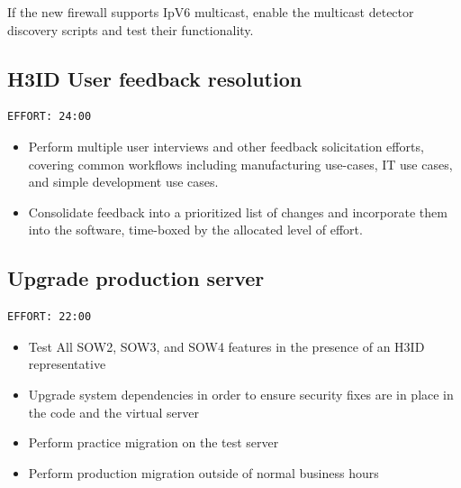 \documentclass[11pt]{article}
\begin{document}
If the new firewall supports IpV6 multicast, enable the multicast detector discovery scripts and
test their functionality.
\subsection{H3ID User feedback resolution}
\label{sec:org2598c26}
\begin{verbatim}
EFFORT: 24:00
\end{verbatim}

\begin{itemize}
\item Perform multiple user interviews and other feedback solicitation efforts, covering common
workflows including manufacturing use-cases, IT use cases, and simple development use cases.
\item Consolidate feedback into a prioritized list of changes and incorporate them into the software,
time-boxed by the allocated level of effort.
\end{itemize}
\subsection{Upgrade production server}
\label{sec:org8260c08}
\begin{verbatim}
EFFORT: 22:00
\end{verbatim}

\begin{itemize}
\item[{$\square$}] Test All SOW2, SOW3, and SOW4 features in the presence of an H3ID representative
\item[{$\square$}] Upgrade system dependencies in order to ensure security fixes are in place in the code and the
virtual server
\item[{$\square$}] Perform practice migration on the test server
\item[{$\square$}] Perform production migration outside of normal business hours
\end{itemize}
\end{document}
